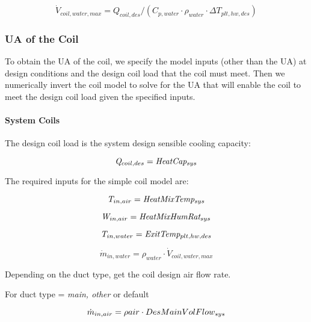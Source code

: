 \begin{equation}
\dot V_{coil,water,max} = Q_{coil,des}/(C_{p,water} \cdot \rho_{water} \cdot \Delta T_{plt,hw,des})
\end{equation}

\subsubsection{UA of the Coil}\label{ua-of-the-coil}

To obtain the UA of the coil, we specify the model inputs (other than the UA) at design conditions and the design coil load that the coil must meet. Then we numerically invert the coil model to solve for the UA that will enable the coil to meet the design coil load given the specified inputs.

\paragraph{System Coils}\label{system-coils-1}

The design coil load is the system design sensible cooling capacity:

\begin{equation}
\emph{Q\(_{coil,des}\)} = \emph{HeatCap\(_{sys}\)}
\end{equation}

The required inputs for the simple coil model are:

\begin{equation}
\emph{T\(_{in,air}\)} = \emph{HeatMixTemp\(_{sys}\)}
\end{equation}

\begin{equation}
\emph{W\(_{in,air}\)} = \emph{HeatMixHumRat\(_{sys}\)}
\end{equation}

\begin{equation}
\emph{T\(_{in,water}\)} = \emph{ExitTemp\(_{plt,hw,des}\)}
\end{equation}

\begin{equation}
\dot m_{in,water} = \rho_{water} \cdot \dot V_{coil,water,max}
\end{equation}

Depending on the duct type, get the coil design air flow rate.

For duct type = \emph{main, other} or default

\begin{equation}
\emph{\(\dot m_{in,air} = \rho{air} \cdot DesMainVolFlow_{sys}\)}
\end{equation}

